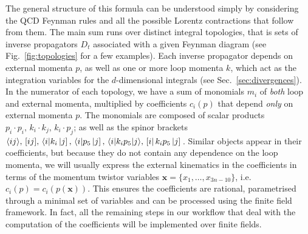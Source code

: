 \documentclass[main.tex]{subfiles}
\begin{document}
The general structure of this formula can be understood simply by considering the QCD Feynman rules and all the possible Lorentz contractions that follow from them. The main sum runs over distinct integral topologies, that is sets of inverse propagators $D_t$  associated with a given Feynman diagram (see Fig.~\ref{fig:topologies} for a few examples). Each inverse propagator depends on external momenta $p$, as well as one or more loop momenta $k$, which act as the integration variables for the $d$-dimensional integrals (see Sec.~\ref{sec:divergences}). In the numerator of each topology, we have a sum of monomials $m_i$ of \textit{both} loop and external momenta, multiplied by coefficients $c_i(p)$ that depend \textit{only} on external momenta $p$. The monomials are composed of scalar products $p_i \cdot p_i,\, k_i \cdot k_j,\, k_i\cdot p_j$; as well as the spinor brackets $\langle ij \rangle,\, [ ij ],\, \langle i |k_i \left| j \right],\, \langle i |p_5 \left| j \right],\, \langle i|k_i p_5|j \rangle,\, \left[ i \right|k_i p_5 \left| j \right]\,$. Similar objects appear in their coefficients, but because they do not contain any dependence on the loop momenta, we will usually express the external kinematics in the coefficients in terms of the momentum twistor variables $\mathbf{x} = \{x_1, \ldots, x_{3n-10}\}$, i.e. $c_i(p) = c_i(p(\mathbf{x}))$. This ensures the coefficients are rational, parametrised through a minimal set of variables and can be processed using the finite field framework. In fact, all the remaining steps in our workflow that deal with the computation of the coefficients will be implemented over finite fields. 
\end{document}
